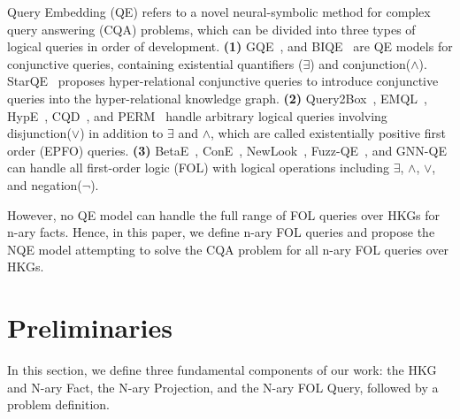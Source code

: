 \documentclass[letterpaper]{article} \usepackage{aaai23}  \usepackage{times}  \usepackage{helvet}  \usepackage{courier}  \usepackage[hyphens]{url}  \usepackage{graphicx} \urlstyle{rm} \def\UrlFont{\rm}  \usepackage{natbib}  \usepackage{caption} \frenchspacing  \setlength{\pdfpagewidth}{8.5in}  \setlength{\pdfpageheight}{11in}  \usepackage{algorithm}
\begin{document}
Query Embedding (QE) refers to a novel neural-symbolic method for complex query answering (CQA) problems, which can be divided into three types of logical queries in order of development. \textbf{(1)} GQE~\citep{GQE}, and BIQE~\citep{BIQE} are QE models for conjunctive queries, containing existential quantifiers ($\exists$) and conjunction($\wedge$). StarQE~\citep{StarQE} proposes hyper-relational conjunctive queries to introduce conjunctive queries into the hyper-relational knowledge graph. \textbf{(2)} Query2Box~\citep{Q2B}, EMQL~\citep{EMQL}, HypE~\citep{HypE}, CQD~\citep{CQD}, and PERM~\citep{PERM} handle arbitrary logical queries involving disjunction($\vee$) in addition to $\exists$ and $\wedge$, which are called existentially positive first order (EPFO) queries. \textbf{(3)} BetaE~\citep{BetaE}, ConE~\citep{ConE}, NewLook~\citep{NewLook}, Fuzz-QE~\citep{FuzzQE}, and GNN-QE~\citep{GNN-QE} can handle all first-order logic (FOL) with logical operations including $\exists$, $\wedge$, $\vee$, and negation($\neg$).

However, no QE model can handle the full range of FOL queries over HKGs for n-ary facts. Hence, in this paper, we define n-ary FOL queries and propose the NQE model attempting to solve the CQA problem for all n-ary FOL queries over HKGs.

\section{Preliminaries}
\label{s3}

In this section, we define three fundamental components of our work: the HKG and N-ary Fact, the N-ary Projection, and the N-ary FOL Query, followed by a problem definition.
\end{document}
